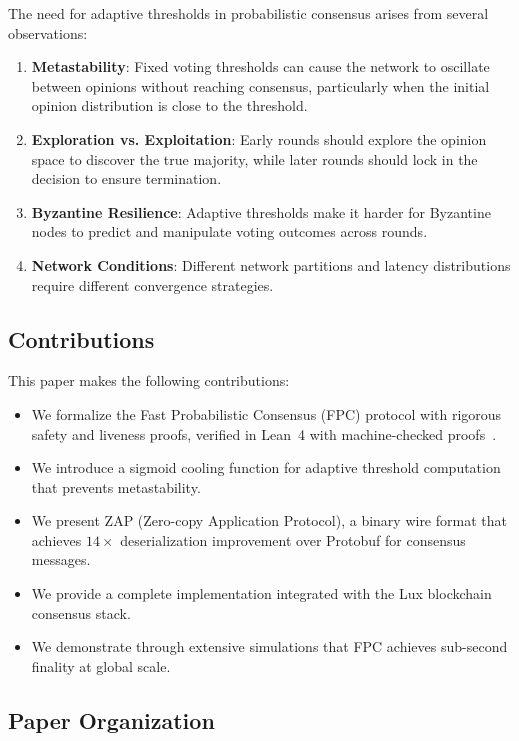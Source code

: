 \documentclass[11pt,a4paper]{article}
\begin{document}
The need for adaptive thresholds in probabilistic consensus arises from several observations:

\begin{enumerate}
\item \textbf{Metastability}: Fixed voting thresholds can cause the network to oscillate between opinions without reaching consensus, particularly when the initial opinion distribution is close to the threshold.

\item \textbf{Exploration vs. Exploitation}: Early rounds should explore the opinion space to discover the true majority, while later rounds should lock in the decision to ensure termination.

\item \textbf{Byzantine Resilience}: Adaptive thresholds make it harder for Byzantine nodes to predict and manipulate voting outcomes across rounds.

\item \textbf{Network Conditions}: Different network partitions and latency distributions require different convergence strategies.
\end{enumerate}

\subsection{Contributions}

This paper makes the following contributions:

\begin{itemize}
\item We formalize the Fast Probabilistic Consensus (FPC) protocol with rigorous safety and liveness proofs, verified in Lean~4 with machine-checked proofs~\cite{luxformal2025}.
\item We introduce a sigmoid cooling function for adaptive threshold computation that prevents metastability.
\item We present ZAP (Zero-copy Application Protocol), a binary wire format that achieves $14\times$ deserialization improvement over Protobuf for consensus messages.
\item We provide a complete implementation integrated with the Lux blockchain consensus stack.
\item We demonstrate through extensive simulations that FPC achieves sub-second finality at global scale.
\end{itemize}

\subsection{Paper Organization}
\end{document}
